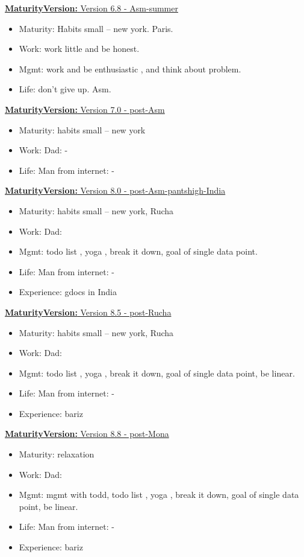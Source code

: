 \documentclass[11pt]{article}
\newcommand{\newMaturityVersion}[1]{\underline{\textbf{MaturityVersion:} #1} }
\begin{document}
\newMaturityVersion{Version 6.8 - Asm-summer}
\begin{itemize} 
\item Maturity: Habits small – new york. Paris. 
\item Work: work little and be honest. 
\item Mgmt: work and be enthusiastic , and think about problem. 
\item Life: don't give up. Asm. 
\end{itemize} 

\newMaturityVersion{Version 7.0 - post-Asm}
\begin{itemize} 
\item Maturity: habits small – new york 
\item Work: Dad:  - 
\item Life: Man from internet: - 
\end{itemize} 

\newMaturityVersion{Version 8.0 - post-Asm-pantshigh-India}
\begin{itemize} 
\item Maturity: habits small – new york, Rucha 
\item Work: Dad: 

\item Mgmt: todo list , yoga , break it down, goal of single data point. 

\item Life: Man from internet: -  
\item Experience: gdocs in India 
\end{itemize} 

\newMaturityVersion{Version 8.5 - post-Rucha}
\begin{itemize} 
\item Maturity: habits small – new york, Rucha 
\item Work: Dad: 
\item Mgmt: todo list , yoga , break it down, goal of single data point,  be linear. 

\item Life: Man from internet: -  
\item Experience: bariz 
\end{itemize} 


\newMaturityVersion{Version 8.8 - post-Mona}
\begin{itemize} 
\item Maturity: relaxation 
\item Work: Dad: 
\item Mgmt: mgmt with todd, todo list , yoga , break it down, goal of single data point,  be linear. 

\item Life: Man from internet: -  
\item Experience: bariz 
\end{itemize} 
\end{document}
